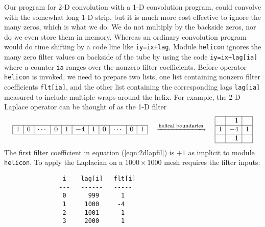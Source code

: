 \par
Our program for 2-D convolution with a 1-D convolution program,
could convolve with the somewhat long 1-D strip,
but it is much more cost effective to ignore the many zeros,
which is what we do.
We do not multiply by the backside zeros, nor do we even store them in memory.
Whereas an ordinary convolution program would do time shifting
by a code line like {\tt iy=ix+lag},
Module
\texttt{helicon} %
ignores the many zero filter values on backside of the tube
by using the code {\tt iy=ix+lag[ia]}
where a counter {\tt ia} ranges over the nonzero filter coefficients.
Before operator {\tt helicon} is invoked,
we need to prepare two lists,
one list containing nonzero filter coefficients {\tt flt[ia]},
and the other list containing the corresponding lags {\tt lag[ia]}
measured to include multiple wraps around the helix.
For example, the 2-D Laplace operator
can be thought of as the 1-D filter
\begin{equation}
\label{eqn:2dlapfil}
\begin{array}{|r|r|r|r|r|r|r|r|r|r|r|r|r|r|r|} \hline
1&0&\cdots&0&1&-4&1&0& \cdots&0&1
\\ \hline
\end{array}
%
\quad
\xrightarrow{\rm helical \; boundaries}
\quad
\begin{array}{|r|r|r|}  \hline
& 1 & \\
\hline
1 & -4 & 1\\
\hline
& 1 & \\
\hline
\end{array}
\end{equation}
%
%
%
The first filter coefficient in equation (\ref{eqn:2dlapfil})
is $+1$ as implicit to module {\tt helicon}.
To apply the Laplacian on a $1000\times 1000$ mesh
requires the filter inputs:
\par\noindent
\footnotesize
\begin{verbatim}
                i    lag[i]   flt[i]
               ---   ------   -----
                0      999      1
                1     1000     -4
                2     1001      1
                3     2000      1
\end{verbatim}
\normalsize

